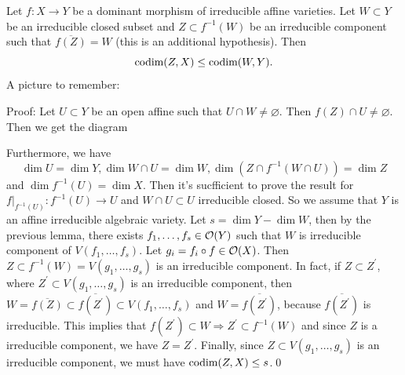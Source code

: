 \begin{dang}
    \begin{theorem}
        Let $f:X\to Y$ be a dominant morphism of irreducible affine varieties. Let 
        $W\subset Y$ be an irreducible closed subset and $Z\subset f^{-1}(W)$ be an irreducible 
        component such that $\overline{f(Z)}=W$ (this is an additional hypothesis). Then 
        \begin{equation}
            \text{codim}(Z,X)\leq \text{codim}(W,Y).
        \end{equation}
        A picture to remember:
        \begin{center}
        \end{center}
    \end{theorem}
\end{dang}
Proof: Let $U\subset Y$ be an open affine such that $U\cap W\neq\varnothing$. Then 
$f(Z)\cap U\neq\varnothing$. Then we get the diagram
\begin{center}
\end{center}
Furthermore, we have 
\begin{equation}
   \dim U = \dim Y, \dim W\cap U = \dim W, \dim(Z\cap f^{-1}(W\cap U))=\dim Z
\end{equation}
and $\dim f^{-1}(U)=\dim X$. Then it's sucfficient to prove the result for 
$f|_{f^{-1}(U)}:f^{-1}(U)\to U$ and $W\cap U\subset U$ irreducible closed. So we assume that $Y$ is an 
affine irreducible algebraic variety. Let $s=\dim Y - \dim W$, then by the previous lemma, there exists 
$f_1,\dots, f_s\in\mathcal{O}(Y)$ such that $W$ is irreducible component of $V(f_1,\dots, f_s)$. Let 
$g_i = f_i\circ f\in\mathcal{O}(X)$. Then $Z\subset f^{-1}(W)=V(g_1,\dots, g_s)$ is an irreducible component. 
In fact, if $Z\subset Z^\prime$, where $Z^\prime\subset V(g_1,\dots, g_s)$ is an irreducible component, then 
$W=\overline{f(Z)}\subset \overline{f(Z^\prime)}\subset V(f_1,\dots, f_s)$ and 
$W=\overline{f(Z^\prime)}$, because $\overline{f(Z^\prime)}$ is irreducible. This implies that 
$f(Z^\prime)\subset W\Rightarrow Z^\prime \subset f^{-1}(W)$ and since $Z$ is a irreducible component, we have 
$Z=Z^\prime$. Finally, since $Z\subset V(g_1,\dots, g_s)$ is an irreducible component, we must 
have $\text{codim}(Z,X)\leq s$.\qed

